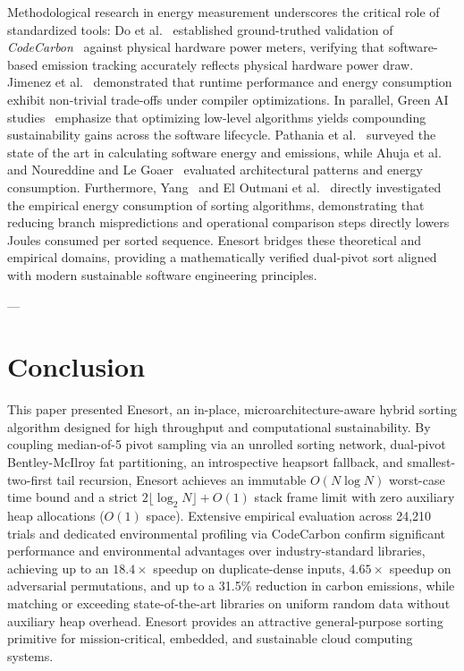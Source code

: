\documentclass[journal]{IEEEtran}
\begin{document}
Methodological research in energy measurement underscores the critical role of standardized tools: Do et al.~\cite{codecarbon2025groundtruthing} established ground-truthed validation of \textit{CodeCarbon}~\cite{schmidt2021codecarbon} against physical hardware power meters, verifying that software-based emission tracking accurately reflects physical hardware power draw. Jimenez et al.~\cite{sciencedirect2025fastergreener,jimenez2025compiler} demonstrated that runtime performance and energy consumption exhibit non-trivial trade-offs under compiler optimizations. In parallel, Green AI studies~\cite{greenai2025languages,carbonefficient2024slr,greenmetrics2025slr,partanen2025mapping,greendevops2026} emphasize that optimizing low-level algorithms yields compounding sustainability gains across the software lifecycle. Pathania et al.~\cite{pathania2025calculating} surveyed the state of the art in calculating software energy and emissions, while Ahuja et al.~\cite{ahuja2025ecodocsense} and Noureddine and Le Goaer~\cite{noureddine2025investigating} evaluated architectural patterns and energy consumption. Furthermore, Yang~\cite{yang2025holistic} and El Outmani et al.~\cite{eloutmani2025energy} directly investigated the empirical energy consumption of sorting algorithms, demonstrating that reducing branch mispredictions and operational comparison steps directly lowers Joules consumed per sorted sequence. Enesort bridges these theoretical and empirical domains, providing a mathematically verified dual-pivot sort aligned with modern sustainable software engineering principles.

---

\section{Conclusion}
This paper presented Enesort, an in-place, microarchitecture-aware hybrid sorting algorithm designed for high throughput and computational sustainability. By coupling median-of-5 pivot sampling via an unrolled sorting network, dual-pivot Bentley-McIlroy fat partitioning, an introspective heapsort fallback, and smallest-two-first tail recursion, Enesort achieves an immutable $O(N \log N)$ worst-case time bound and a strict $2 \lfloor \log_2 N \rfloor + O(1)$ stack frame limit with zero auxiliary heap allocations ($O(1)$ space). 
Extensive empirical evaluation across 24,210 trials and dedicated environmental profiling via CodeCarbon confirm significant performance and environmental advantages over industry-standard libraries, achieving up to an $18.4\times$ speedup on duplicate-dense inputs, $4.65\times$ speedup on adversarial permutations, and up to a 31.5\% reduction in carbon emissions, while matching or exceeding state-of-the-art libraries on uniform random data without auxiliary heap overhead. Enesort provides an attractive general-purpose sorting primitive for mission-critical, embedded, and sustainable cloud computing systems.



\end{document}
